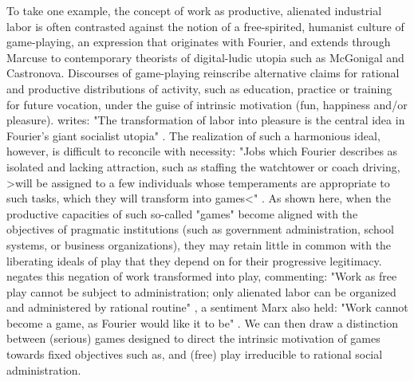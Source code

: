 To take one example, the concept of work as productive, alienated industrial labor is often contrasted against the notion of a free-spirited, humanist culture of game-playing, an expression that originates with Fourier, and extends through Marcuse to contemporary theorists of digital-ludic utopia such as McGonigal and Castronova. Discourses of game-playing reinscribe alternative claims for rational and productive distributions of activity, such as education, practice or training for future vocation, under the guise of intrinsic motivation (fun, happiness and/or pleasure). \citeauthor{Marcuse1974-oy} writes: "The transformation of labor into pleasure is the central idea in Fourier's giant socialist utopia" \autocite[207]{Marcuse1974-oy}. The realization of such a harmonious ideal, however, is difficult to reconcile with necessity: "Jobs which Fourier describes as isolated and lacking attraction, such as staffing the watchtower or coach driving, >will be assigned to a few individuals whose temperaments are appropriate to such tasks, which they will transform into games<" \autocite[37]{Granter2012-lo}. As shown here, when the productive capacities of such so-called "games" become aligned with the objectives of pragmatic institutions (such as government administration, school systems, or business organizations), they may retain little in common with the liberating ideals of play that they depend on for their progressive legitimacy. \citeauthor{Marcuse1974-oy} negates this negation of work transformed into play, commenting: "Work as free play cannot be subject to administration; only alienated labor can be organized and administered by rational routine" \autocite[208]{Marcuse1974-oy}, a sentiment Marx also held: "Work cannot become a game, as Fourier would like it to be" \autocite[qtd. in][66]{Granter2012-lo}. We can then draw a distinction between (serious) games designed to direct the intrinsic motivation of games towards fixed objectives such as, and (free) play irreducible to rational social administration.

